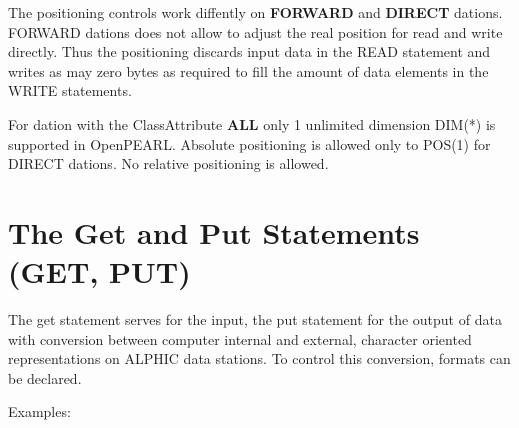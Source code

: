 \begin{added}
The positioning controls work diffently on {\bf FORWARD} and {\bf DIRECT}
dations. FORWARD dations does not allow to adjust the real position for read
and write directly. 
Thus the positioning discards input data in the READ statement and 
writes as may zero bytes as required to fill the amount of data elements
in the WRITE statements.
\end{added}

\begin{added}
For dation with the ClassAttribute {\bf ALL} only 1 unlimited dimension
DIM(*) is supported in OpenPEARL.
Absolute positioning is allowed only to POS(1) for DIRECT dations.
No relative positioning is allowed.
\end{added}

\section{The Get and Put Statements (GET, PUT)}    %
\label{sec_get_put}

The get statement serves for the input, the put statement for the
output of data with conversion between computer internal and external,
character oriented representations on ALPHIC data stations. To control
this conversion, formats can be declared.

Examples:

